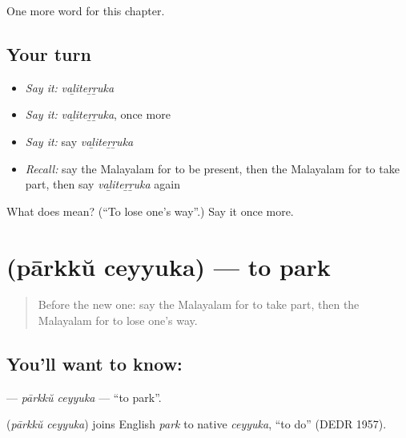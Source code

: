 \begin{grammarlens}[title={What you've built}]
One more word for this chapter.
\end{grammarlens}

\subsection*{Your turn}
\begin{itemize}
\raggedright
  \item \emph{Say it:} \emph{vaḻiteṟṟuka}
  \item \emph{Say it:} \emph{vaḻiteṟṟuka}, once more
  \item \emph{Say it:} say \emph{vaḻiteṟṟuka}
  \item \emph{Recall:} say the Malayalam for to be present, then the Malayalam for to take part, then say \emph{vaḻiteṟṟuka} again
\end{itemize}

\begin{tcolorbox}[breakable,colback=teal!4,colframe=teal!35!black,title={Before you move on}]
What does  mean? (\textquotedblleft{}To lose one's way\textquotedblright{}.) Say it once more.
\end{tcolorbox}
\section[\texorpdfstring{\ml{പാർക്ക്} \ml{ചെയ്യുക} (pārkkŭ ceyyuka)}{പാർക്ക് ചെയ്യുക (pārkkŭ ceyyuka)}]{  (pārkkŭ ceyyuka) — to park}

\label{lesson:ML-C227-parkku-ceyyuka}



\begin{quote}
Before the new one: say the Malayalam for to take part, then the Malayalam for to lose one's way.
\end{quote}

\subsection*{You'll want to know:  }
\textbf{ } — \emph{pārkkŭ ceyyuka} — \textquotedblleft{}to park\textquotedblright{}.

\begin{cousinweb}
\textbf{ } (\emph{pārkkŭ ceyyuka}) joins English \emph{park} to native \emph{ceyyuka}, \textquotedblleft{}to do\textquotedblright{} (DEDR 1957).
\end{cousinweb}

